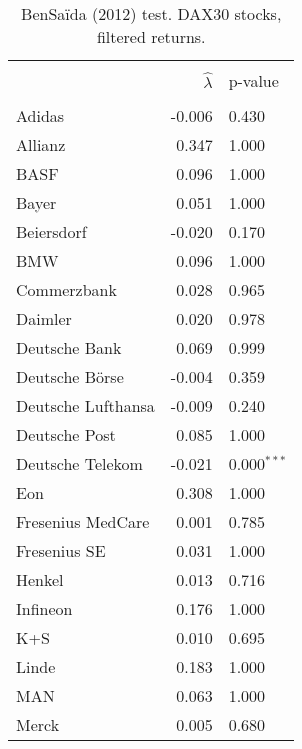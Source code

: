 \documentclass[12pt]{article}
\begin{document}
\begin{table} [H]
    \caption{ BenSa\"{i}da (2012) test. DAX30 stocks, filtered returns.}
    \begin{tabular*}{\textwidth}{@{\extracolsep{\fill}}lrl}
        \hline &  &  \\ 
        
                  & $\hat{\lambda}$ &  p-value \\
        \hline &  &  \\ 

        Adidas                      &  -0.006 & 0.430  \\ 
        Allianz                      & 0.347 &  1.000 \\ 
        BASF                       & 0.096 &  1.000 \\ 
        Bayer                       & 0.051 & 1.000  \\ 
        Beiersdorf                 & -0.020 & 0.170  \\ 
        BMW                        & 0.096 & 1.000  \\ 
        Commerzbank                & 0.028 &  0.965  \\ 
        Daimler                    & 0.020 &  0.978 \\ 
        Deutsche Bank              & 0.069 &  0.999 \\ 
        Deutsche B\"orse           & -0.004 &  0.359 \\ 
        Deutsche Lufthansa         & -0.009 &  0.240 \\ 
        Deutsche Post              & 0.085 &   1.000\\ 
        Deutsche Telekom           & -0.021 &  0.000$^{***}$ \\ 
        Eon                        & 0.308 &  1.000 \\ 
        Fresenius MedCare          & 0.001 & 0.785  \\ 
        Fresenius SE               & 0.031 & 1.000  \\ 
        Henkel                     & 0.013 & 0.716  \\ 
        Infineon                   & 0.176 & 1.000  \\ 
        K+S                       & 0.010 &  0.695 \\ 
        Linde                     & 0.183 &  1.000 \\ 
        MAN                       & 0.063 & 1.000  \\ 
        Merck                     & 0.005 & 0.680  \\ 

\end{tabular*}
\end{table}
\end{document}
